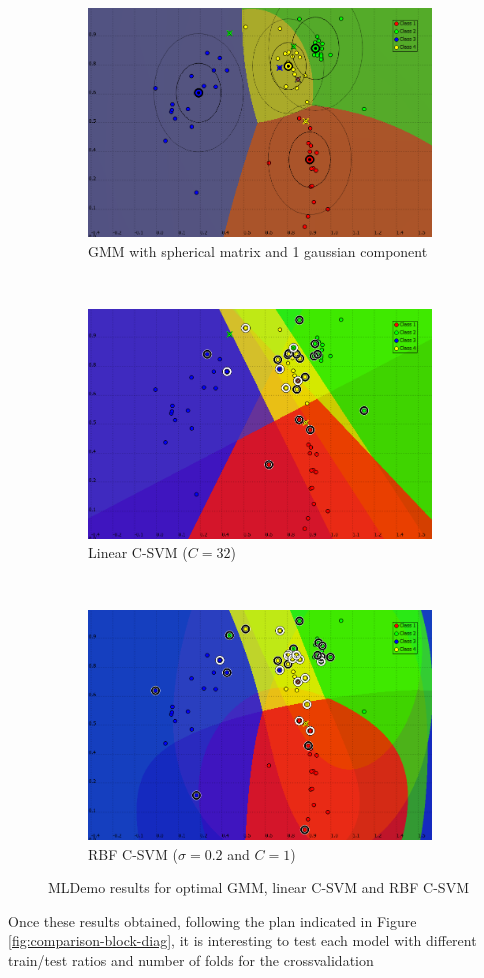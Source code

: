 \documentclass[a4paper,10pt]{article}
\begin{document}
\begin{figure}[H]
\centering
     \begin{subfigure}[t]{0.3\textwidth} 
      \centering
      \includegraphics[height= 3.2 cm]{pictures/classification-best-GMM-SPH-C1.png}
      \caption{GMM with spherical matrix and 1 gaussian component}
      \label{fig:classification-best-GMM}
     \end{subfigure}
      ~
    \begin{subfigure}[t]{0.3\textwidth} 
      \centering
      \includegraphics[height= 3.2 cm]{pictures/classification-best-CSVM-C32.png}
      \caption{Linear C-SVM ($C=32$)}
      \label{fig:classification-best-lin-CSVM}
     \end{subfigure}
     ~
    \begin{subfigure}[t]{0.3\textwidth} 
      \centering
      \includegraphics[height= 3.2 cm]{pictures/classification-best-CSVM-C1-S02.png}
      \caption{RBF C-SVM ($\sigma = 0.2$ and $C=1$)}
      \label{fig:classification-best-RBFCSVM}
     \end{subfigure}
    \caption{MLDemo results for optimal GMM, linear C-SVM and RBF C-SVM}
    \label{fig:best-plots}

\end{figure}


Once these results obtained, following the plan indicated in Figure \ref{fig:comparison-block-diag}, it is interesting to test each model with different train/test ratios and number of folds for the crossvalidation
\end{document}
